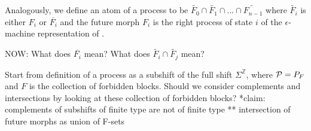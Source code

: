 \documentclass[prl,twocolumn,superscriptaddress,preprintnumbers,floatfix]{revtex4-1}
\begin{document}
Analogously, we define an atom of a process \Process to be $\widetilde{F_0} \cap \widetilde{F_1} \cap ... \cap \widetilde{F_{n-1}}$ where $\widetilde{F_i}$ is either $F_i$ or $\overline{F_i}$ and the future morph $F_i$ is the right process of state $i$ of the $\epsilon$-machine representation of \Process. 

NOW: What does $\overline{F_i}$ mean?
What does $\widetilde{F_i} \cap \widetilde{F_j}$ mean? 

Start from definition of a process \Process as a subshift of the full shift $\Sigma^{\mathbb{Z}}$, where $\mathcal{P} = P_{F}$ and $F$ is the collection of forbidden blocks.  Should we consider complements and intersections by looking at these collection of forbidden blocks? 
*claim: complements of subshifts of finite type are not of finite type
** intersection of future morphs as union of F-sets



\end{document}
